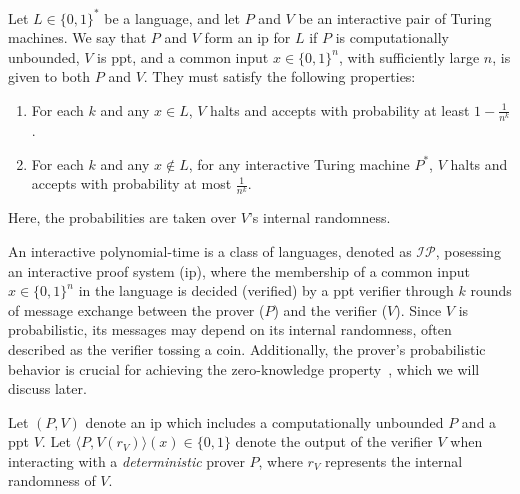 \begin{definition}\label{def:Interactive Proof System}
	Let \( L \in \{0,1\}^* \) be a language, and let \( P \) and \( V \) be an interactive pair of Turing machines. We say that \( P \) and \( V \) form an \gls{ip} for \( L \) if \( P \) is computationally unbounded, \( V \) is \gls{ppt}, and a common input \( x \in \{0,1\}^n \), with sufficiently large \( n \), is given to both \( P \) and \( V \). They must satisfy the following properties:
	\vspace{-0.5\baselineskip} %
	\begin{enumerate}[leftmargin=2em] %
		\item For each \( k \) and any \( x \in L \), \( V \) halts and accepts with probability at least \( 1 - \frac{1}{n^k} \).
		\item For each \( k \) and any \( x \notin L \), for any interactive Turing machine \( P^* \), \( V \) halts and accepts with probability at most \( \frac{1}{n^k} \).
	\end{enumerate}
	\vspace{-0.5\baselineskip} %
	Here, the probabilities are taken over \( V \)'s internal randomness.
\end{definition}
 
 An interactive polynomial-time is a class of languages, denoted as $\mathcal{IP}$, posessing an interactive proof system (\gls{ip}), where the membership of a common input $x\in\{0,1\}^n$ in the language is decided (verified) by a \gls{ppt} verifier through $k$ rounds of message exchange between the prover ($P$) and the verifier ($V$). 
Since  $V$ is probabilistic, its messages may depend on its internal randomness, often described as the verifier tossing a coin. Additionally, the prover's probabilistic behavior is crucial for achieving the zero-knowledge property~\cite{Goldwasser1985}, which we will discuss later. 

Let $(P,V)$ denote an \gls{ip} which includes a computationally unbounded $P$ and a \gls{ppt} $V$. Let \( \langle P, V(r_V) \rangle (x) \in \{0,1\} \) denote the output of the verifier \( V \) when interacting with a \textit{deterministic} prover \( P \), where \( r_V \) represents the internal randomness of \( V \). 

